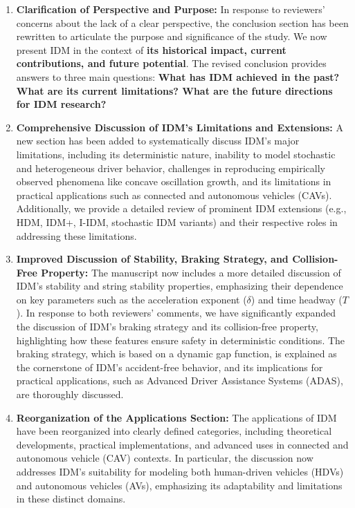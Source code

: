 \documentclass[a4paper,fleqn,11pt]{reviewresponse}
\begin{document}
\begin{enumerate}
    \item \textbf{Clarification of Perspective and Purpose:} 
    In response to reviewers' concerns about the lack of a clear perspective, the conclusion section has been rewritten to articulate the purpose and significance of the study. We now present IDM in the context of \textbf{its historical impact, current contributions, and future potential}. The revised conclusion provides answers to three main questions: \textbf{What has IDM achieved in the past? What are its current limitations? What are the future directions for IDM research?}

    \item \textbf{Comprehensive Discussion of IDM’s Limitations and Extensions:} 
    A new section has been added to systematically discuss IDM’s major limitations, including its deterministic nature, inability to model stochastic and heterogeneous driver behavior, challenges in reproducing empirically observed phenomena like concave oscillation growth, and its limitations in practical applications such as connected and autonomous vehicles (CAVs). Additionally, we provide a detailed review of prominent IDM extensions (e.g., HDM, IDM+, I-IDM, stochastic IDM variants) and their respective roles in addressing these limitations.

    \item \textbf{Improved Discussion of Stability, Braking Strategy, and Collision-Free Property:} 
    The manuscript now includes a more detailed discussion of IDM’s stability and string stability properties, emphasizing their dependence on key parameters such as the acceleration exponent (\(\delta\)) and time headway (\(T\)). In response to both reviewers’ comments, we have significantly expanded the discussion of IDM’s braking strategy and its collision-free property, highlighting how these features ensure safety in deterministic conditions. The braking strategy, which is based on a dynamic gap function, is explained as the cornerstone of IDM’s accident-free behavior, and its implications for practical applications, such as Advanced Driver Assistance Systems (ADAS), are thoroughly discussed.

    \item \textbf{Reorganization of the Applications Section:} 
    The applications of IDM have been reorganized into clearly defined categories, including theoretical developments, practical implementations, and advanced uses in connected and autonomous vehicle (CAV) contexts. In particular, the discussion now addresses IDM’s suitability for modeling both human-driven vehicles (HDVs) and autonomous vehicles (AVs), emphasizing its adaptability and limitations in these distinct domains.


\end{enumerate}
\end{document}
